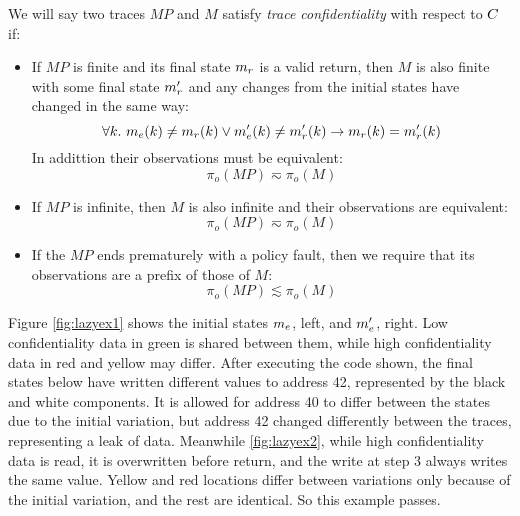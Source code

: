 \documentclass[acmsmall,review,anonymous]{acmart}\settopmatter{printfolios=true,printccs=false,printacmref=false}
\begin{document}
We will say two traces $MP$ and $M$ satisfy {\em trace
  confidentiality} with respect to $C$ if:
\begin{itemize}
\item If $MP$ is finite and its final state $m_r$ is a valid
  return, then $M$ is also finite with some final state $m_r'$ and
  any changes from the initial states have changed in the same way:
$$\forall k. ~ m_e(k) \not = m_r(k)
  \vee m_e'(k) \not = m_r'(k) \rightarrow
  m_r(k) = m_r'(k)$$
  In addittion their observations must be equivalent:
  $$\pi_o(MP) \eqsim \pi_o(M)$$
\item If $MP$ is infinite, then $M$ is also infinite and their
  observations are equivalent:
  $$\pi_o(MP) \eqsim \pi_o(M)$$
\item If the $MP$ ends prematurely with a policy fault, then
  we require that its observations are a prefix of those of $M$:
  $$\pi_o(MP) \lesssim \pi_o(M)$$
\end{itemize}

Figure \ref{fig:lazyex1} shows the initial states \(m_e\), left,
and \(m_e'\), right. Low confidentiality data in green is shared
between them, while high confidentiality data in red and yellow may differ.
After executing the code shown, the final states below have written different
values to address 42, represented by the black and white components.
It is allowed for address 40 to differ between the states due to the initial
variation, but address 42 changed differently between the traces, representing
a leak of data. Meanwhile \ref{fig:lazyex2}, while high confidentiality data
is read, it is overwritten before return, and the write at step 3 always writes
the same value. Yellow and red locations differ between variations only because
of the initial variation, and the rest are identical. So this example passes.

\end{document}
